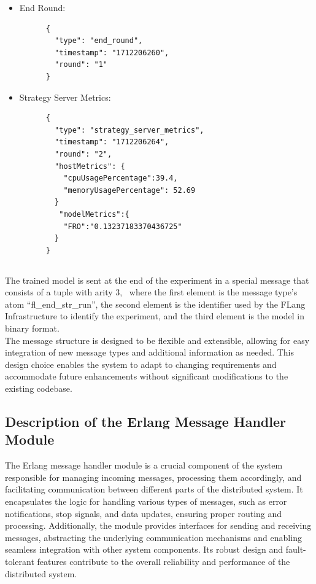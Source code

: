 \begin{itemize}
    \item End Round:
    \begin{verbatim}
      {
        "type": "end_round",
        "timestamp": "1712206260",
        "round": "1"
      }
    \end{verbatim}

    \item Strategy Server Metrics:
    \begin{verbatim}
      {
        "type": "strategy_server_metrics",
        "timestamp": "1712206264",
        "round": "2",
        "hostMetrics": {
          "cpuUsagePercentage":39.4,
          "memoryUsagePercentage": 52.69
        }
         "modelMetrics":{
          "FRO":"0.13237183370436725"
        }
      }
    \end{verbatim}
   
\end{itemize}

\subsection{}
The trained model is sent at the end of the experiment in a special message that consists of a tuple with arity 3, \
where the first element is the message type's atom ``fl\_end\_str\_run'',
the second element is the identifier used by the FLang Infrastructure to identify the experiment, and the third element is the model in binary format.
\\
The message structure is designed to be flexible and extensible, allowing for easy integration of new message types and
additional information as needed. This design choice enables the system to adapt to changing requirements and accommodate
future enhancements without significant modifications to the existing codebase.

\subsection{Description of the Erlang Message Handler Module}
The Erlang message handler module is a crucial component of the system responsible for managing incoming messages, processing them accordingly, and facilitating communication between different parts of the distributed system. It encapsulates the logic for handling various types of messages, such as error notifications, stop signals, and data updates, ensuring proper routing and processing. Additionally, the module provides interfaces for sending and receiving messages, abstracting the underlying communication mechanisms and enabling seamless integration with other system components. Its robust design and fault-tolerant features contribute to the overall reliability and performance of the distributed system.